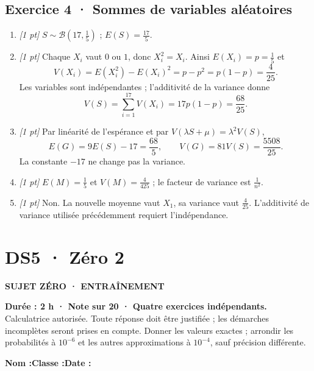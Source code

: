 \subsection*{Exercice 4 · Sommes de variables aléatoires}\begin{enumerate}

\item \textit{[1 pt]} $S\sim\mathcal B(17,\frac{1}{5})$ ; $E(S)=\frac{17}{5}$.

\item \textit{[1 pt]} Chaque $X_i$ vaut $0$ ou $1$, donc $X_i^2=X_i$. Ainsi $E(X_i)=p=\frac{1}{5}$ et
\[V(X_i)=E(X_i^2)-E(X_i)^2=p-p^2=p(1-p)=\frac{4}{25}.\]
Les variables sont indépendantes ; l'additivité de la variance donne
\[V(S)=\sum_{i=1}^{17}V(X_i)=17p(1-p)=\frac{68}{25}.\]

\item \textit{[1 pt]} Par linéarité de l'espérance et par $V(\lambda S+\mu)=\lambda^2V(S)$,
\[E(G)=9E(S)-17=\frac{68}{5},\qquad V(G)=81V(S)=\frac{5508}{25}.\]
La constante $-17$ ne change pas la variance.

\item \textit{[1 pt]} $E(M)=\frac{1}{5}$ et $V(M)=\frac{4}{425}$ ; le facteur de variance est $\frac{1}{n^2}$.

\item \textit{[1 pt]} Non. La nouvelle moyenne vaut $X_1$, sa variance vaut $\frac{4}{25}$. L'additivité de variance utilisée précédemment requiert l'indépendance.

\end{enumerate}

\fi

\clearpage{}\label{sujet:7-2}

\section*{DS5 · Zéro 2}

{\sffamily\bfseries\color{teal}SUJET ZÉRO · ENTRAÎNEMENT\par}

\textbf{Durée : 2 h · Note sur 20 · Quatre exercices indépendants.}\\Calculatrice autorisée. Toute réponse doit être justifiée ; les démarches incomplètes seront prises en compte. Donner les valeurs exactes ; arrondir les probabilités à $10^{-6}$ et les autres approximations à $10^{-4}$, sauf précision différente.

\smallskip\textbf{Nom :}\enspace\dotfill\quad\textbf{Classe :}\enspace\dotfill\quad\textbf{Date :}\enspace\dotfill

